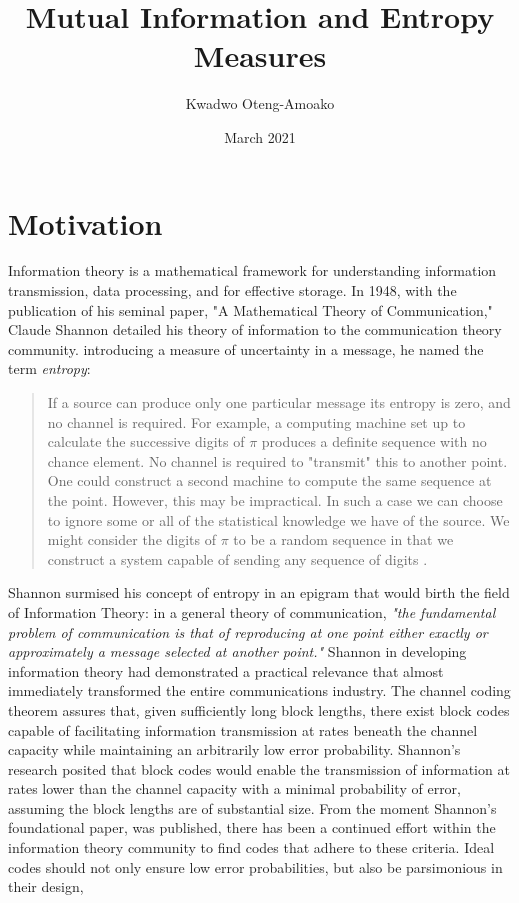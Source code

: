 \documentclass[journal,12pt,onecolumn,draftclsnofoot,]{IEEEtran}
\title{Mutual Information and Entropy Measures}
\date{March 2021}
\author{Kwadwo Oteng-Amoako}
\begin{document}
\maketitle

	
	\section{Motivation}	
	
	Information theory is a mathematical framework for understanding information transmission, data processing, and for effective storage. In 1948, with the publication of his seminal  paper, "A Mathematical Theory of Communication," Claude Shannon detailed his theory of information to the communication theory community. introducing a measure of uncertainty in a message, he named the term \emph{entropy}:


	\begin{quote}
		{If a source can produce only one particular message its entropy is zero, and no channel is required. For example, a computing machine set up to calculate the successive digits of \(\pi\) produces a definite sequence with no chance element. No channel is required to "transmit" this to another point. One could construct a second machine to compute the same sequence at the point. However, this may be impractical. In such a case we can choose to ignore some or all of the statistical knowledge we have of the source. We might consider the digits of \(\pi\) to be a random sequence in that we construct a system capable of sending any sequence of digits \cite{shannon1948a, shannon1945mathematical, shannon1957some, shannon1967lowera, shannon1967lowerb}.} 
	\end{quote}

	Shannon surmised his concept of entropy in an epigram that would birth the field of Information Theory: in a general theory of communication, \emph{"the fundamental problem of communication is that of reproducing at one point either exactly or approximately a message selected at another point."} Shannon in developing information theory had demonstrated a practical relevance that  almost immediately transformed the entire communications industry. The channel coding theorem assures that, given sufficiently long block lengths, there exist block codes capable of facilitating information transmission at rates beneath the channel capacity while maintaining an arbitrarily low error probability. Shannon's research posited that block codes would enable the transmission of information at rates lower than the channel capacity with a minimal probability of error, assuming the block lengths are of substantial size. From the moment Shannon's foundational paper, was published, there has been a continued effort within the information theory community to find codes that adhere to these criteria. Ideal codes should not only ensure low error probabilities, but also be parsimonious  in their design, 
	
\end{document}
